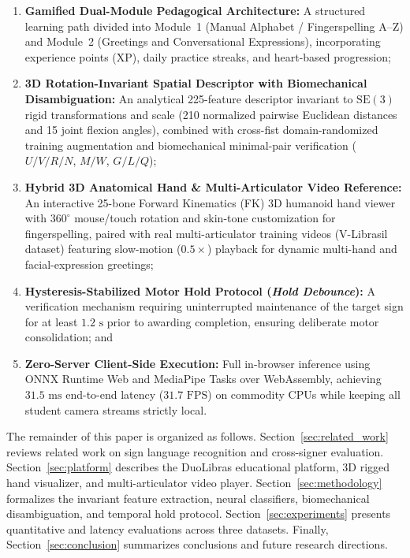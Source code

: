 \documentclass[12pt,a4paper]{article}
\begin{document}
\begin{enumerate}
    \item \textbf{Gamified Dual-Module Pedagogical Architecture:} A structured learning path divided into Module~1 (Manual Alphabet / Fingerspelling A--Z) and Module~2 (Greetings and Conversational Expressions), incorporating experience points (XP), daily practice streaks, and heart-based progression;

    \item \textbf{3D Rotation-Invariant Spatial Descriptor with Biomechanical Disambiguation:} An analytical 225-feature descriptor invariant to $\text{SE}(3)$ rigid transformations and scale (210 normalized pairwise Euclidean distances and 15 joint flexion angles), combined with cross-fist domain-randomized training augmentation and biomechanical minimal-pair verification ($\textit{U}/\textit{V}/\textit{R}/\textit{N}$, $\textit{M}/\textit{W}$, $\textit{G}/\textit{L}/\textit{Q}$);

    \item \textbf{Hybrid 3D Anatomical Hand \& Multi-Articulator Video Reference:} An interactive 25-bone Forward Kinematics (FK) 3D humanoid hand viewer with $360^\circ$ mouse/touch rotation and skin-tone customization for fingerspelling, paired with real multi-articulator training videos (V-Librasil dataset) featuring slow-motion ($0.5\times$) playback for dynamic multi-hand and facial-expression greetings;

    \item \textbf{Hysteresis-Stabilized Motor Hold Protocol (\textit{Hold Debounce}):} A verification mechanism requiring uninterrupted maintenance of the target sign for at least $1.2\text{ s}$ prior to awarding completion, ensuring deliberate motor consolidation; and

    \item \textbf{Zero-Server Client-Side Execution:} Full in-browser inference using ONNX Runtime Web and MediaPipe Tasks over WebAssembly, achieving $31.5\text{ ms}$ end-to-end latency ($31.7\text{ FPS}$) on commodity CPUs while keeping all student camera streams strictly local.
\end{enumerate}

The remainder of this paper is organized as follows. Section~\ref{sec:related_work} reviews related work on sign language recognition and cross-signer evaluation. Section~\ref{sec:platform} describes the DuoLibras educational platform, 3D rigged hand visualizer, and multi-articulator video player. Section~\ref{sec:methodology} formalizes the invariant feature extraction, neural classifiers, biomechanical disambiguation, and temporal hold protocol. Section~\ref{sec:experiments} presents quantitative and latency evaluations across three datasets. Finally, Section~\ref{sec:conclusion} summarizes conclusions and future research directions.
\end{document}
